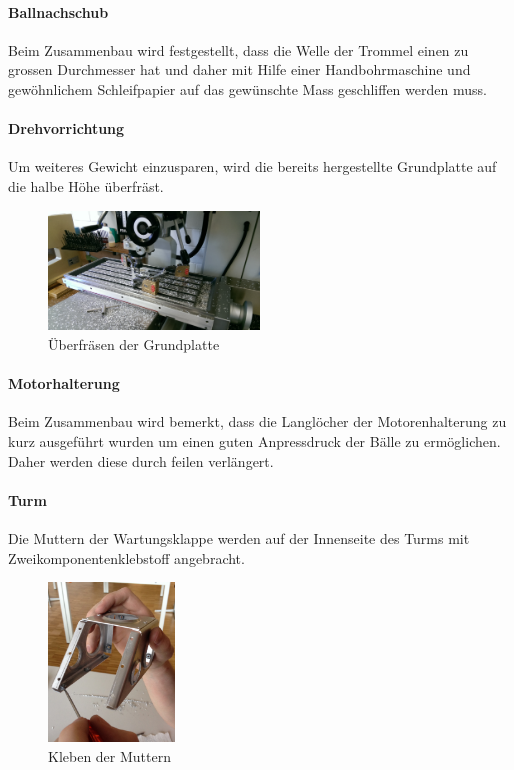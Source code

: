 \paragraph{Ballnachschub}
Beim Zusammenbau wird festgestellt, dass die Welle der Trommel einen zu 
grossen Durchmesser hat und daher mit Hilfe einer Handbohrmaschine und 
gewöhnlichem Schleifpapier auf das gewünschte Mass geschliffen werden muss.

\paragraph{Drehvorrichtung}
Um weiteres Gewicht einzusparen, wird die bereits hergestellte Grundplatte auf 
die halbe Höhe überfräst.

\begin{figure}[h!]
	\centering
	\includegraphics[width=0.5\textwidth]{fig/IMAG0357.jpg}
	\caption{Überfräsen der Grundplatte}
	\label{fig:Grundplatte fräsen}
\end{figure}
\FloatBarrier

\paragraph{Motorhalterung}
Beim Zusammenbau wird bemerkt, dass die Langlöcher der Motorenhalterung zu 
kurz ausgeführt wurden um einen guten Anpressdruck der Bälle zu ermöglichen. 
Daher werden diese durch feilen verlängert.

\paragraph{Turm}
Die Muttern der Wartungsklappe werden auf der Innenseite des Turms mit 
Zweikomponentenklebstoff angebracht. 

\begin{figure}[h!]
	\centering
	\includegraphics[width=0.3\textwidth]{fig/IMG_2292.JPG}
	\caption{Kleben der Muttern}
	\label{fig:Muttern Kleben}
\end{figure}
\FloatBarrier


